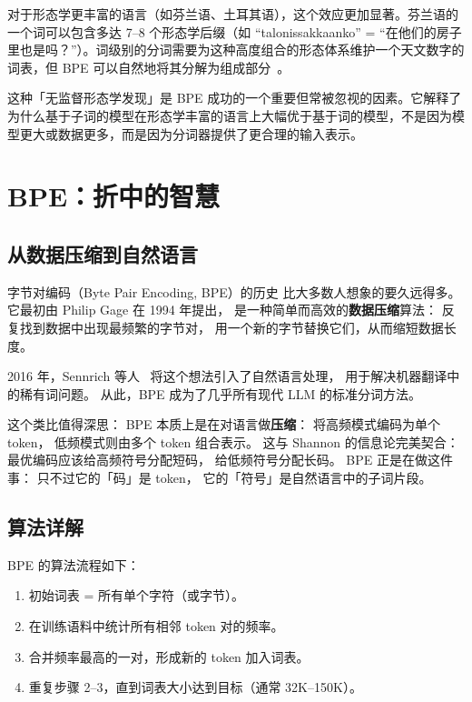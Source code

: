 对于形态学更丰富的语言（如芬兰语、土耳其语），这个效应更加显著。芬兰语的一个词可以包含多达 7--8 个形态学后缀（如 “talonissakkaanko” = “在他们的房子里也是吗？”）。词级别的分词需要为这种高度组合的形态体系维护一个天文数字的词表，但 BPE 可以自然地将其分解为组成部分~\cite{sennrich2016bpe}。

这种「无监督形态学发现」是 BPE 成功的一个重要但常被忽视的因素。它解释了为什么基于子词的模型在形态学丰富的语言上大幅优于基于词的模型，不是因为模型更大或数据更多，而是因为分词器提供了更合理的输入表示。

\section{BPE：折中的智慧}

\subsection{从数据压缩到自然语言}

字节对编码（Byte Pair Encoding, BPE）的历史
比大多数人想象的要久远得多。
它最初由 Philip Gage 在 1994 年提出，
是一种简单而高效的\textbf{数据压缩}算法：
反复找到数据中出现最频繁的字节对，
用一个新的字节替换它们，从而缩短数据长度。

2016 年，Sennrich 等人~\cite{sennrich2016bpe}
将这个想法引入了自然语言处理，
用于解决机器翻译中的稀有词问题。
从此，BPE 成为了几乎所有现代 LLM 的标准分词方法。

这个类比值得深思：
BPE 本质上是在对语言做\textbf{压缩}：
将高频模式编码为单个 token，
低频模式则由多个 token 组合表示。
这与 Shannon 的信息论完美契合：
最优编码应该给高频符号分配短码，
给低频符号分配长码。
BPE 正是在做这件事：
只不过它的「码」是 token，
它的「符号」是自然语言中的子词片段。

\subsection{算法详解}

BPE 的算法流程如下：
\begin{enumerate}[noitemsep]
  \item 初始词表 = 所有单个字符（或字节）。
  \item 在训练语料中统计所有相邻 token 对的频率。
  \item 合并频率最高的一对，形成新的 token 加入词表。
  \item 重复步骤 2--3，直到词表大小达到目标（通常 32K--150K）。
\end{enumerate}

